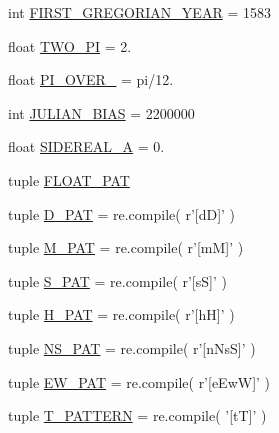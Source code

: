 \begin{DoxyCompactItemize}
\item 
int \hyperlink{namespaceamonpy_1_1sim_1_1sidereal__m_a11c19f5fb22cb192b8cd48a9ad3f5b0e}{F\-I\-R\-S\-T\-\_\-\-G\-R\-E\-G\-O\-R\-I\-A\-N\-\_\-\-Y\-E\-A\-R} = 1583
\item 
float \hyperlink{namespaceamonpy_1_1sim_1_1sidereal__m_ae23ecb23e3a043f3851b30c42cb9aa5c}{T\-W\-O\-\_\-\-P\-I} = 2.
\item 
float \hyperlink{namespaceamonpy_1_1sim_1_1sidereal__m_ac765e90836e95c8b75181438ab72671a}{P\-I\-\_\-\-O\-V\-E\-R\-\_} = pi/12.
\item 
int \hyperlink{namespaceamonpy_1_1sim_1_1sidereal__m_a56431e0d53d6e44010a9f50886823cf6}{J\-U\-L\-I\-A\-N\-\_\-\-B\-I\-A\-S} = 2200000
\item 
float \hyperlink{namespaceamonpy_1_1sim_1_1sidereal__m_a883e8197cf5ed1c389f4dbcfd8a9cd0e}{S\-I\-D\-E\-R\-E\-A\-L\-\_\-\-A} = 0.
\item 
tuple \hyperlink{namespaceamonpy_1_1sim_1_1sidereal__m_a3ca443ece574fa126427d995a5992be8}{F\-L\-O\-A\-T\-\_\-\-P\-A\-T}
\item 
tuple \hyperlink{namespaceamonpy_1_1sim_1_1sidereal__m_a36dded2ae7c61bb0bcf6060b1e3d62e7}{D\-\_\-\-P\-A\-T} = re.\-compile( r'\mbox{[}d\-D\mbox{]}' )
\item 
tuple \hyperlink{namespaceamonpy_1_1sim_1_1sidereal__m_a42714b75b39de317bf61fb9953455c17}{M\-\_\-\-P\-A\-T} = re.\-compile( r'\mbox{[}m\-M\mbox{]}' )
\item 
tuple \hyperlink{namespaceamonpy_1_1sim_1_1sidereal__m_a2fc65a0a9abc9f2f519d6b1754cc027a}{S\-\_\-\-P\-A\-T} = re.\-compile( r'\mbox{[}s\-S\mbox{]}' )
\item 
tuple \hyperlink{namespaceamonpy_1_1sim_1_1sidereal__m_a73fee03d46d8b2421dbeb60f71462365}{H\-\_\-\-P\-A\-T} = re.\-compile( r'\mbox{[}h\-H\mbox{]}' )
\item 
tuple \hyperlink{namespaceamonpy_1_1sim_1_1sidereal__m_a23fa30b390eca6ffe322d1bfad9f9de9}{N\-S\-\_\-\-P\-A\-T} = re.\-compile( r'\mbox{[}n\-Ns\-S\mbox{]}' )
\item 
tuple \hyperlink{namespaceamonpy_1_1sim_1_1sidereal__m_a8e77ac540138fcb3ae84bc714faeec6c}{E\-W\-\_\-\-P\-A\-T} = re.\-compile( r'\mbox{[}e\-Ew\-W\mbox{]}' )
\item 
tuple \hyperlink{namespaceamonpy_1_1sim_1_1sidereal__m_a8005eb0af38a9506bd011904bffd057a}{T\-\_\-\-P\-A\-T\-T\-E\-R\-N} = re.\-compile( '\mbox{[}t\-T\mbox{]}' )
\item 

\end{DoxyCompactItemize}
